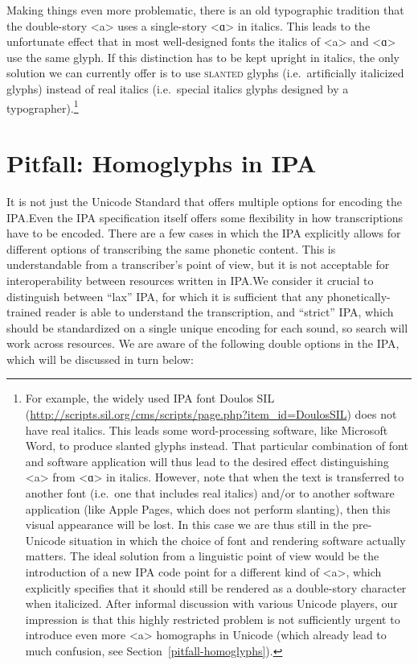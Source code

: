 Making things even more problematic, there is an old typographic tradition that
the double-story <a> uses a single-story <ɑ> in italics. This leads to the
unfortunate effect that in most well-designed fonts the italics of <a> and <ɑ>
use the same glyph. If this distinction has to be kept upright in italics, the
only solution we can currently offer is to use \textsc{slanted} glyphs
(i.e.~artificially italicized glyphs) instead of real italics (i.e.~special
italics glyphs designed by a typographer).\footnote{For example, the widely used
IPA font Doulos SIL
(\url{http://scripts.sil.org/cms/scripts/page.php?item\_id=DoulosSIL}) does not
have real italics. This leads some word-processing software, like Microsoft
Word, to produce slanted glyphs instead. That particular combination of font and
software application will thus lead to the desired effect distinguishing <a>
from <ɑ> in italics. However, note that when the text is transferred to another
font (i.e.~one that includes real italics) and/or to another software
application (like Apple Pages, which does not perform slanting), then this
visual appearance will be lost. In this case we are thus still in the
pre-Unicode situation in which the choice of font and rendering software
actually matters. The ideal solution from a linguistic point of view would be
the introduction of a new IPA code point for a different kind of <a>, which
explicitly specifies that it should still be rendered as a double-story
character when italicized. After informal discussion with various Unicode
players, our impression is that this highly restricted problem is not
sufficiently urgent to introduce even more <a> homographs in Unicode (which
already lead to much confusion, see Section~\ref{pitfall-homoglyphs}).}

\section{Pitfall: Homoglyphs in IPA}
\label{pitfall-homoglyphs-in-IPA}

It is not just the Unicode Standard that offers multiple options for encoding
the IPA.\@ Even the IPA specification itself offers some flexibility in how
transcriptions have to be encoded. There are a few cases in which the IPA
explicitly allows for different options of transcribing the same phonetic
content. This is understandable from a transcriber's point of view, but it is
not acceptable for interoperability between resources written in IPA.\@ We
consider it crucial to distinguish between ``lax'' IPA, for which it is
sufficient that any phonetically-trained reader is able to understand the
transcription, and ``strict'' IPA, which should be standardized on a single
unique encoding for each sound, so search will work across resources. We are 
aware of the following double options in the IPA, which will be discussed in 
turn below:


